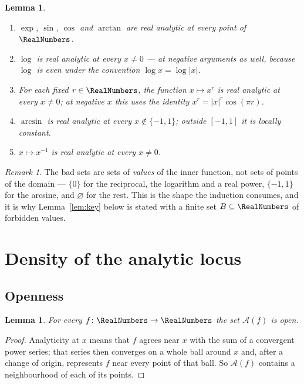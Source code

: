 \documentclass[11pt,oneside]{article}
\newtheorem{lemma}[theorem]{Lemma}
\theoremstyle{definition}
\theoremstyle{remark}
\newtheorem{remark}[theorem]{Remark}
\newcommand{\An}{\mathcal A}
\begin{document}
\begin{lemma}\label{lem:generators}
\leavevmode
\begin{enumerate}
\item $\exp$, $\sin$, $\cos$ and $\arctan$ are real analytic at every point
      of $\RealNumbers$.
\item $\log$ is real analytic at every $x\ne 0$ --- at negative arguments as
      well, because $\log$ is even under the convention $\log x=\log|x|$.
\item For each fixed $r\in\RealNumbers$, the function $x\mapsto x^{r}$ is real analytic
      at every $x\ne 0$; at negative $x$ this uses the identity
      $x^{r}=|x|^{r}\cos(\pi r)$.
\item $\arcsin$ is real analytic at every $x\notin\{-1,1\}$; outside
      $[-1,1]$ it is locally constant.
\item $x\mapsto x^{-1}$ is real analytic at every $x\ne 0$.
\end{enumerate}
\end{lemma}

\begin{remark}
The bad sets are sets of \emph{values} of the inner function, not sets of
points of the domain --- $\{0\}$ for the reciprocal, the logarithm and a real
power, $\{-1,1\}$ for the arcsine, and $\varnothing$ for the rest.  This is
the shape the induction consumes, and it is why Lemma~\ref{lem:key} below is stated
with a finite set $B\subseteq\RealNumbers$ of forbidden values.
\end{remark}

\section{Density of the analytic locus}\label{sec:density}

\subsection{Openness}

\begin{lemma}\label{lem:open}
For every $f\colon\RealNumbers\to\RealNumbers$ the set $\An(f)$ is open.
\end{lemma}

\begin{proof}
Analyticity at $x$ means that $f$ agrees near $x$ with the sum of a
convergent power series; that series then converges on a whole ball around
$x$ and, after a change of origin, represents $f$ near every point of that
ball.  So $\An(f)$ contains a neighbourhood of each of its points.
\end{proof}
\end{document}
